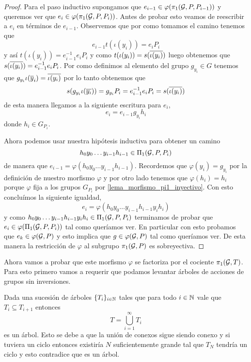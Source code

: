 \documentclass[tesis.tex]{subfiles}
\begin{document}
\begin{proof}
	Para el paso inductivo supongamos que $e_{i-1} \in \varphi(\pi_1({\cal G}, P, P_{i-1}))$ y queremos ver que $e_i \in \varphi(\pi_1({\cal G}, P, P_{i}))$.
	Antes de probar esto veamos de reescribir a $e_i$ en términos de $e_{i-1}$.
	Observemos que por como tomamos el camino tenemos que
	\[
		e_{i-1} t(\iota (y_i)) = e_i P_i 
	\]
	y así $t(\iota (y_i)) = e_{i-1}^{-1} e_i P_i$ y como $t(\iota (y_i)) = s(\overline{\iota(y_i)})$ luego obtenemos que $s(\overline{\iota(y_i)}) = e_{i-1}^{-1} e_i P_i$.
	Por como definimos al elemento del grupo $g_{y_i} \in G$ tenemos que $g_{y_i} \iota (\overline y_i) = \overline{\iota (y_i)}$ por lo tanto obtenemos que 
	\[
		s(g_{y_i} \iota (\overline{y_i})) = g_{y_i} P_i = e_{i-1}^{-1} e_i P_i = s(\overline{\iota (y_i)})
	\]
	de esta manera llegamos a la siguiente escritura para $e_i$,
	\begin{equation*}
		e_i  = e_{i-1}g_{y_i} h_i 
	\end{equation*}
	donde $h_i \in G_{P_i}$. 
	
	Ahora podemos usar nuestra hipótesis inductiva para obtener un camino 
	\[
		h_0y_0 \dots y_{i-1}h_{i-1} \in \Pi_1({\cal G}, P, P_i)
	\]
	de manera que $e_{i-1} =  \varphi(h_0y_0 \dots y_{i-1}h_{i-1})$. 
	Recordemos que $\varphi(y_i) = g_{y_i}$ por la definición de nuestro morfismo $\varphi$ y por otro lado tenemos que $\varphi(h_i) = h_i$ porque $\varphi$ fija a los grupos $G_{P_i}$ por \ref{lema_morfismo_pi1_inyectivo}.
	Con esto concluímos la siguiente igualdad,
	\[
		e_i = \varphi(h_0y_0 \dots y_{i-1}h_{i-1} y_i h_i)
	\]
	y como $h_0y_0 \dots y_{i-1}h_{i-1} y_i h_i \in \Pi_1({\cal G}, P, P_i)$ terminamos de probar que $e_{i} \in \varphi(\Pi_1({\cal G}, P, P_i))$ tal como queríamos ver. 
	En particular con esto probamos que $e_k \in \varphi({\cal G}, P)$ y esto implica que $g \in \varphi({\cal G}, P)$ tal como queríamos ver.
	De esta manera la restricción de $\varphi$ al subgrupo $\pi_1({\cal G}, P)$ es sobreyectiva.
\end{proof}

Ahora vamos a probar que este morfismo $\varphi$ se factoriza por el cociente $\pi_1({\cal G}, T)$.
Para esto primero vamos a requerir que podamos levantar árboles de acciones de grupos sin inversiones.

\begin{obs}\label{lema_union_arboles}
	Dada una sucesión de árboles $\{T_{i}\}_{i\in \mathbb{N}}$ tales que para todo $i \in \mathbb{N}$ vale que $T_{i} \subseteq T_{i+1}$ entonces 
	\[
	T = \bigcup_{i=1}^{\infty} T_{i}
	\]
	es un árbol.
	Esto se debe a que la unión de conexos sigue siendo conexo y si tuviera un ciclo entonces existiría $N$ suficientemente grande tal que $T_{N}$ tendría un ciclo y esto contradice que es un árbol.
\end{obs}
\end{document}
